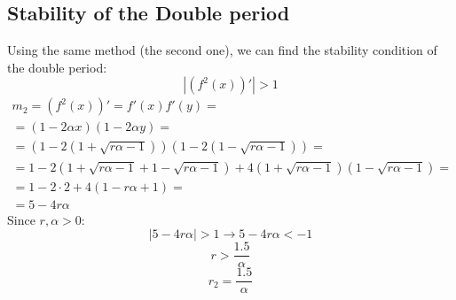 \documentclass{article}
\begin{document}
\subsection{Stability of the Double period}
Using the same method (the second one), we can find the stability condition of the double period:
\begin{equation}
    \left|\left(f^2(x)\right)'\right| > 1
\end{equation}
\begin{equation}
\begin{gathered}
    m_2 = \left(f^2(x)\right)' = f'(x)f'(y) = \\ =
    (1 - 2\alpha x)(1 - 2\alpha y) = \\ =
    \left(1 - 2\left(1 + \sqrt{r\alpha - 1}\right)\right)\left(1 - 2\left(1 - \sqrt{r\alpha - 1}\right)\right) = \\ =
    1 - 2\left(1 + \sqrt{r\alpha - 1} + 1 - \sqrt{r\alpha - 1}\right) + 4\left(1 + \sqrt{r\alpha - 1}\right)\left(1 - \sqrt{r\alpha - 1}\right) = \\ =
    1 - 2 \cdot 2 + 4(1 - r\alpha + 1) = \\ =
    5 - 4 r\alpha
\end{gathered}
\end{equation}
Since $r, \alpha > 0$:
\begin{equation}
    \left|5 - 4 r\alpha\right| > 1 \rightarrow 5 - 4 r\alpha < -1
\end{equation}
\begin{equation}
    r > \frac{1.5}{\alpha}
\end{equation}
\begin{equation}
    r_2 = \frac{1.5}{\alpha}
\end{equation}
\end{document}
